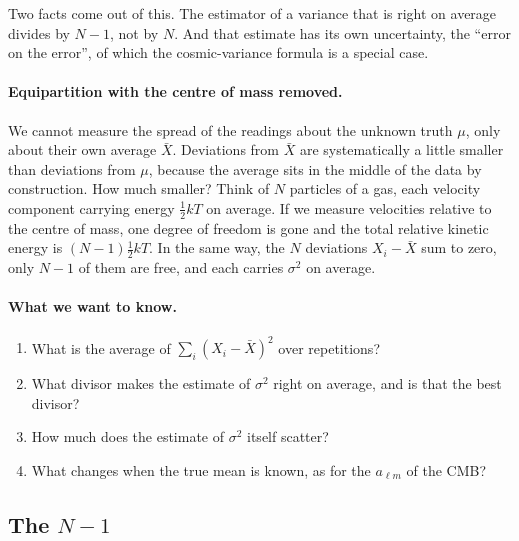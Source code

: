 Two facts come out of this. The estimator of a variance that is right on
average divides by $N-1$, not by $N$. And that estimate has its own
uncertainty, the ``error on the error'', of which the cosmic-variance
formula is a special case.

\paragraph{Equipartition with the centre of mass removed.}
We cannot measure the spread of the readings about the unknown truth $\mu$,
only about their own average $\bar X$. Deviations from $\bar X$ are
systematically a little smaller than deviations from $\mu$, because the
average sits in the middle of the data by construction. How much smaller?
Think of $N$ particles of a gas,
each velocity component carrying energy $\tfrac12kT$ on average. If we
measure velocities relative to the centre of mass, one degree of freedom is
gone and the total relative kinetic energy is $(N-1)\tfrac12kT$. In the same
way, the $N$ deviations $X_i-\bar X$ sum to zero, only $N-1$ of them are
free, and each carries $\sigma^2$ on average.

\paragraph{What we want to know.}
\begin{enumerate}[label=\arabic*.]
  \item What is the average of $\sum_i(X_i-\bar X)^2$ over repetitions?
  \item What divisor makes the estimate of $\sigma^2$ right on average, and is
        that the best divisor?
  \item How much does the estimate of $\sigma^2$ itself scatter?
  \item What changes when the true mean is known, as for the $a_{\ell m}$
        of the CMB?
\end{enumerate}

\subsection{The $N-1$}
\label{3a:sec:n-minus-one}

